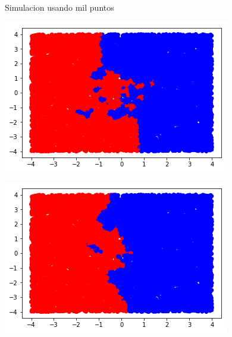 \documentclass[12pt, a4paper]{article}
\begin{document}
\begin{figure}[H]
\begin{minipage}[b]{.3\linewidth}
		\label{fig:mil_13}
	\end{minipage}
	\caption{Simulacion usando mil puntos}\label{fig:mil}
\end{figure}


\begin{figure}[H]
	\begin{minipage}[b]{.3\linewidth}
		\includegraphics[width = \textwidth]{diez_mil_puntos_1_vecino}
		\label{fig:diez_mil_1}
	\end{minipage}
	\begin{minipage}[b]{.3\linewidth}
		\includegraphics[width = \textwidth]{diez_mil_puntos_3_vecino}
		\label{fig:diez_mil_3}
	\end{minipage}
	\begin{minipage}[b]{.3\linewidth}

\end{minipage}
\end{figure}
\end{document}
